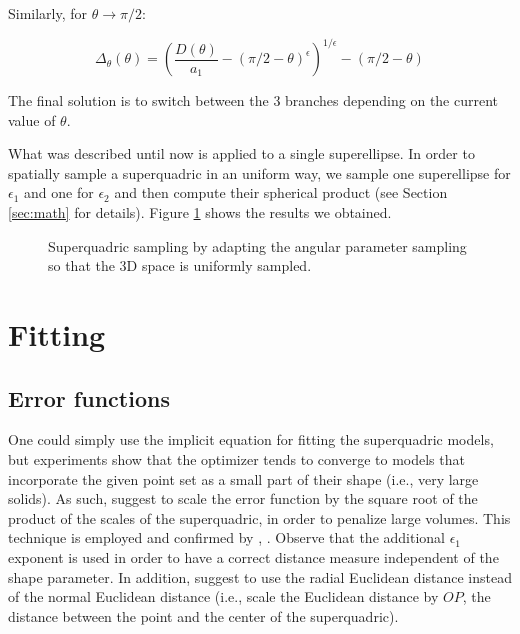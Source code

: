 \documentclass{article}
\begin{document}
Similarly, for $\theta \rightarrow \pi/2$:

\begin{equation}
\Delta_\theta (\theta) = \left( \frac{D(\theta)}{a_1} - (\pi/2 - \theta)^\epsilon \right)^{1/\epsilon} - (\pi/2 - \theta)
\end{equation}

The final solution is to switch between the 3 branches depending on the current value of $\theta$.

What was described until now is applied to a single superellipse. In order to spatially sample a superquadric in an uniform way, we sample one superellipse for $\epsilon_1$ and one for $\epsilon_2$ and then compute their spherical product (see Section \ref{sec:math} for details). Figure \ref{fig:sampling_smart} shows the results we obtained.

\begin{figure}
\centering
\hspace {1cm}
\caption {Superquadric sampling by adapting the angular parameter sampling so that the 3D space is uniformly sampled.}
\label{fig:sampling_smart}
\end{figure}



\section {Fitting}
\label{sec:fitting}

\subsection*{Error functions}

One could simply use the implicit equation for fitting the superquadric models, but experiments show that the optimizer tends to converge to models that incorporate the given point set as a small part of their shape (i.e., very large solids). As such, \cite{SQ_2000} suggest to scale the error function by the square root of the product of the scales of the superquadric, in order to penalize large volumes. This technique is employed and confirmed by \cite{journals/pami/KatsoulasBK08}, \cite{conf/wscg/ChevalierJB03}. Observe that the additional $\epsilon_1$ exponent is used in order to have a correct distance measure independent of the shape parameter. In addition, \cite{conf/wscg/ChevalierJB03} suggest to use the radial Euclidean distance instead of the normal Euclidean distance (i.e., scale the Euclidean distance by $OP$, the distance between the point and the center of the superquadric).
\end{document}
